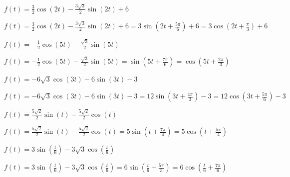 \documentclass{ximera}
\begin{document}
\begin{question}
\begin{problem}
$f(t) = \frac{3}{2} \cos(2t) - \frac{3\sqrt{3}}{2} \sin(2t) + 6$

\begin{solution}
$f(t) = \frac{3}{2} \cos(2t) - \frac{3\sqrt{3}}{2} \sin(2t) + 6 =3\sin\left(2t + \frac{5\pi}{6}\right) + 6   = 3\cos\left(2t + \frac{\pi}{3}\right) + 6$
\end{solution}
\end{problem}

\begin{problem}
$f(t) = -\frac{1}{2} \cos(5t) -\frac{\sqrt{3}}{2} \sin(5t)$

\begin{solution}
$f(t) = -\frac{1}{2} \cos(5t) -\frac{\sqrt{3}}{2} \sin(5t) =  \sin\left(5t + \frac{7\pi}{6}\right) = \cos\left(5t + \frac{2\pi}{3}\right)$
\end{solution}
\end{problem}

\begin{problem}
$f(t) = -6\sqrt{3} \cos(3t) - 6\sin(3t) - 3$

\begin{solution}
$f(t) = -6\sqrt{3} \cos(3t) - 6\sin(3t) - 3 = 12\sin\left(3t + \frac{4\pi}{3}\right) - 3 = 12\cos\left(3t + \frac{5\pi}{6}\right) - 3$
\end{solution}
\end{problem}

\begin{problem}
$f(t) =  \frac{5\sqrt{2}}{2} \sin(t)  -\frac{5\sqrt{2}}{2} \cos(t)$

\begin{solution}
$f(t) =  \frac{5\sqrt{2}}{2} \sin(t)  -\frac{5\sqrt{2}}{2} \cos(t) = 5\sin\left(t + \frac{7\pi}{4}\right)= 5\cos\left(t + \frac{5\pi}{4}\right)$
\end{solution}
\end{problem}

\begin{problem}\label{expandedsinusoidexerlast}
$f(t) =3 \sin \left(\frac{t}{6}\right) -3\sqrt{3} \cos \left(\frac{t}{6}\right)$

\begin{solution}
$f(t) =3\sin\left(\frac{t}{6}\right) -3\sqrt{3} \cos\left(\frac{t}{6}\right) = 6\sin\left( \frac{t}{6}+\frac{5\pi}{3}\right)= 6\cos\left( \frac{t}{6}+\frac{7\pi}{6}\right) $
\end{solution}
\end{problem}
\end{question}
\end{document}
